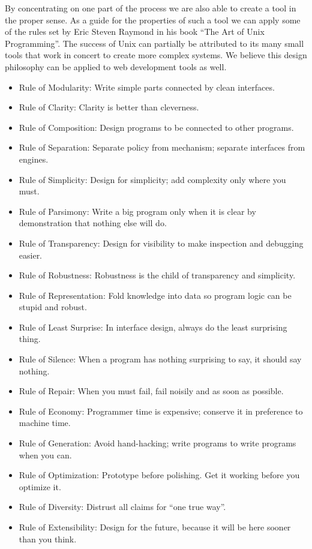 \documentclass[thesis.tex]{subfiles}
\begin{document}
By concentrating on one part of the process we are also able to create a tool in
the proper sense. As a guide for the properties of such a tool we can apply
some of the rules set by Eric Steven Raymond in his book
``The Art of Unix Programming''. The success of Unix can partially be attributed
to its many small tools that work in concert to create more complex systems.
We believe this design philosophy can be applied to web development tools as
well.
\begin{citequote}{\cite[Chapter 1]{UXART}}
\begin{itemize}
	\item Rule of Modularity: Write simple parts connected by clean interfaces.
	\item Rule of Clarity: Clarity is better than cleverness.
	\item Rule of Composition: Design programs to be connected to other programs.
	\item Rule of Separation: Separate policy from mechanism; separate interfaces from engines.
	\item Rule of Simplicity: Design for simplicity; add complexity only where you must.
	\item Rule of Parsimony: Write a big program only when it is clear by demonstration that nothing else will do.
	\item Rule of Transparency: Design for visibility to make inspection and debugging easier.
	\item Rule of Robustness: Robustness is the child of transparency and simplicity.
	\item Rule of Representation: Fold knowledge into data so program logic can be stupid and robust.
	\item Rule of Least Surprise: In interface design, always do the least surprising thing.
	\item Rule of Silence: When a program has nothing surprising to say, it should say nothing.
	\item Rule of Repair: When you must fail, fail noisily and as soon as possible.
	\item Rule of Economy: Programmer time is expensive; conserve it in preference to machine time.
	\item Rule of Generation: Avoid hand-hacking; write programs to write programs when you can.
	\item Rule of Optimization: Prototype before polishing. Get it working before you optimize it.
	\item Rule of Diversity: Distrust all claims for ``one true way''.
	\item Rule of Extensibility: Design for the future, because it will be here sooner than you think.
\end{itemize}
\end{citequote}
\end{document}
